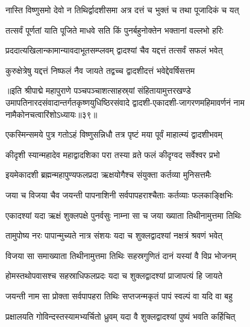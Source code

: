 \twolineshloka
{नास्ति विष्णुसमो देवो न तिथिर्द्वादशीसमा}
{अत्र दत्तं च भुक्तं च तथा पूजादिकं च यत्}%

\twolineshloka
{तत्सर्वं पूर्णतां याति पूजिते माधवे सति}
{किं पुनर्बहुनोक्तेन भक्तानां वल्लभो हरिः}%

\twolineshloka
{प्रददात्यखिलान्कामान्यावदाभूतसम्प्लवम्}
{द्वादश्यां चैव यद्दत्तं तत्सर्वं सफलं भवेत्}%

\twolineshloka
{कुरुक्षेत्रेषु यद्दत्तं निष्फलं नैव जायते}
{तद्वच्च द्वादशीदत्तं भवेद्देवर्षिसत्तम}%

॥इति श्रीपाद्मे महापुराणे पञ्चपञ्चाशत्साहस्र्यां संहितायामुत्तरखण्डे उमापतिनारदसंवादान्तर्गतकृष्णयुधिष्ठिरसंवादे द्वादशी-एकादशी-जागरणमहिमावर्णनं नाम नामैकोनचत्वारिंशोऽध्यायः॥३९॥


\hyperref[sec:ekadashi_mahatmyam_padma_puranam]{\closesub}
\clearpage

\label{sec:padma-margashirsha-krishna-utpanna}


\twolineshloka
{एकस्मिन्समये पुत्र गतोऽहं विष्णुसन्निधौ}
{तत्र पृष्टं मया पूर्वं माहात्म्यं द्वादशीभवम्}%


\twolineshloka
{कीदृशी स्यान्महादेव महाद्वादशिका परा}
{तस्या व्रते फलं कीदृग्वद सर्वेश्वर प्रभो}%


\twolineshloka
{इयमेकादशी ब्रह्मन्महापुण्यफलप्रदा}
{ऋक्षयोगैश्च संयुक्ता कर्तव्या मुनिसत्तमैः}%

\twolineshloka
{जया च विजया चैव जयन्ती पापनाशिनी}
{सर्वपापहराश्चैताः कर्तव्याः फलकाङ्क्षिभिः}%

\twolineshloka
{एकादश्यां यदा ऋक्षं शुक्लपक्षे पुनर्वसुः}
{नाम्ना सा च जया ख्याता तिथीनामुत्तमा तिथिः}%

\twolineshloka
{तामुपोष्य नरः पापान्मुच्यते नात्र संशयः}
{यदा च शुक्लद्वादश्यां नक्षत्रं श्रवणं भवेत्}%

\twolineshloka
{विजया सा समाख्याता तिथीनामुत्तमा तिथिः}
{सहस्रगुणितं दानं यस्यां वै विप्र भोजनम्}%

\twolineshloka
{होमस्तथोपवासश्च सहस्राधिफलप्रदः}
{यदा च शुक्लद्वादश्यां प्राजापत्यं हि जायते}%

\twolineshloka
{जयन्ती नाम सा प्रोक्ता सर्वपापहरा तिथिः}
{सप्तजन्मकृतं पापं स्वल्पं वा यदि वा बहु}%

\twolineshloka
{प्रक्षालयति गोविन्दस्तस्यामभ्यर्चितो ध्रुवम्}
{यदा वै शुक्लद्वादश्यां पुष्यं भवति कर्हिचित्}%

